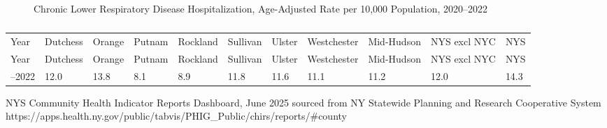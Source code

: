 \documentclass[
  english,
  letterpaper,
]{report}
\begin{document}
\begin{figure}


\caption{\label{fig-clrd-hospital-aar}Chronic Lower Respiratory Disease
Hospitalization, Age-Adjusted Rate per 10,000 Population, 2020--2022}

\end{figure}%

\begin{longtable}[]{@{}lllllllllll@{}}

\caption{\label{tbl-clrd-hospital-aar}Chronic Lower Respiratory Disease
Hospitalization, Age-Adjusted Rate per 10,000 Population, 2020--2022}

\tabularnewline

\caption{}\label{T_8215a}\tabularnewline
\toprule\noalign{}
Year & Dutchess & Orange & Putnam & Rockland & Sullivan & Ulster &
Westchester & Mid-Hudson & NYS excl NYC & NYS \\
\midrule\noalign{}
\endfirsthead
\toprule\noalign{}
Year & Dutchess & Orange & Putnam & Rockland & Sullivan & Ulster &
Westchester & Mid-Hudson & NYS excl NYC & NYS \\
\midrule\noalign{}
\endhead
\bottomrule\noalign{}
\endlastfoot
2020--2022 & 12.0 & 13.8 & 8.1 & 8.9 & 11.8 & 11.6 & 11.1 & 11.2 & 12.0
& 14.3 \\

\end{longtable}

\begin{tcolorbox}[enhanced jigsaw, breakable, leftrule=.75mm, title=\textcolor{quarto-callout-note-color}{\faInfo}\hspace{0.5em}{Source}, bottomrule=.15mm, opacityback=0, left=2mm, colback=white, bottomtitle=1mm, coltitle=black, colbacktitle=quarto-callout-note-color!10!white, colframe=quarto-callout-note-color-frame, opacitybacktitle=0.6, toptitle=1mm, titlerule=0mm, arc=.35mm, rightrule=.15mm, toprule=.15mm]

NYS Community Health Indicator Reports Dashboard, June 2025 sourced from
NY Statewide Planning and Research Cooperative System
https://apps.health.ny.gov/public/tabvis/PHIG\_Public/chirs/reports/\#county

\end{tcolorbox}
\end{document}
